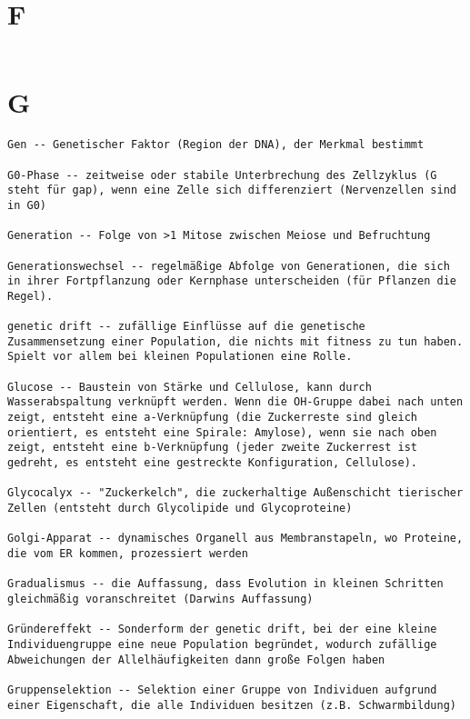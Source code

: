 \documentclass{article}
\begin{document}
\section{F}
\begin{verbatim}

\end{verbatim}
\newpage


\section{G}
\begin{verbatim}
Gen -- Genetischer Faktor (Region der DNA), der Merkmal bestimmt

G0-Phase -- zeitweise oder stabile Unterbrechung des Zellzyklus (G steht für gap), wenn eine Zelle sich differenziert (Nervenzellen sind in G0)

Generation -- Folge von >1 Mitose zwischen Meiose und Befruchtung

Generationswechsel -- regelmäßige Abfolge von Generationen, die sich in ihrer Fortpflanzung oder Kernphase unterscheiden (für Pflanzen die Regel).

genetic drift -- zufällige Einflüsse auf die genetische Zusammensetzung einer Population, die nichts mit fitness zu tun haben. Spielt vor allem bei kleinen Populationen eine Rolle.

Glucose -- Baustein von Stärke und Cellulose, kann durch Wasserabspaltung verknüpft werden. Wenn die OH-Gruppe dabei nach unten zeigt, entsteht eine a-Verknüpfung (die Zuckerreste sind gleich orientiert, es entsteht eine Spirale: Amylose), wenn sie nach oben zeigt, entsteht eine b-Verknüpfung (jeder zweite Zuckerrest ist gedreht, es entsteht eine gestreckte Konfiguration, Cellulose).

Glycocalyx -- "Zuckerkelch", die zuckerhaltige Außenschicht tierischer Zellen (entsteht durch Glycolipide und Glycoproteine)

Golgi-Apparat -- dynamisches Organell aus Membranstapeln, wo Proteine, die vom ER kommen, prozessiert werden

Gradualismus -- die Auffassung, dass Evolution in kleinen Schritten gleichmäßig voranschreitet (Darwins Auffassung)

Gründereffekt -- Sonderform der genetic drift, bei der eine kleine Individuengruppe eine neue Population begründet, wodurch zufällige Abweichungen der Allelhäufigkeiten dann große Folgen haben

Gruppenselektion -- Selektion einer Gruppe von Individuen aufgrund einer Eigenschaft, die alle Individuen besitzen (z.B. Schwarmbildung)
\end{verbatim}
\newpage
\end{document}
